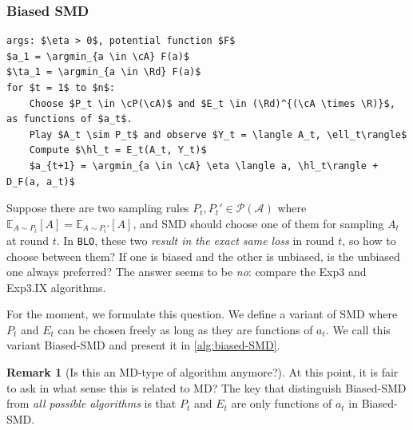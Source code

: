 \documentclass{article}
\theoremstyle{plain}
\theoremstyle{definition}
\newtheorem{remark}[theorem]{Remark}
\newcommand{\R}{\mathbb R}
\newcommand{\Rd}{\mathbb{R}^d}
\newcommand{\argmin}{\operatornamewithlimits{arg\,min}}
\newcommand{\E}{\mathbb E}
\newcommand{\cA}{\mathcal A}
\newcommand{\cP}{\mathcal P}
\newcommand{\ta}{\tilde{a}}
\newcommand{\mdalg}{\textsf{MD}\xspace}
\newcommand{\smdalg}{\textsf{SMD}\xspace}
\newcommand{\expthree}{\textsf{Exp3}\xspace}
\newcommand{\expthreeix}{\textsf{Exp3.IX}\xspace}
\newcommand{\blo}{\texttt{BLO}\xspace}
\newcommand{\hl}{\hat{\ell}\xspace}
\begin{document}
\subsubsection{Biased \smdalg}
\begin{algorithm}[h!]
    \begin{minipage}{13cm}
        \begin{mdframed}
            \begin{lstlisting}
args: $\eta > 0$, potential function $F$
$a_1 = \argmin_{a \in \cA} F(a)$
$\ta_1 = \argmin_{a \in \Rd} F(a)$
for $t = 1$ to $n$:
    Choose $P_t \in \cP(\cA)$ and $E_t \in (\Rd)^{(\cA \times \R)}$, as functions of $a_t$.
    Play $A_t \sim P_t$ and observe $Y_t = \langle A_t, \ell_t\rangle$
    Compute $\hl_t = E_t(A_t, Y_t)$
    $a_{t+1} = \argmin_{a \in \cA} \eta \langle a, \hl_t\rangle + D_F(a, a_t)$
\end{lstlisting}
            \caption{Biased \smdalg}\label{alg:biased-SMD}
        \end{mdframed}
    \end{minipage}
\end{algorithm}

Suppose there are two sampling rules $P_t, P_t' \in \cP(\cA)$ where
$\E_{A \sim P_t}[A] = \E_{A \sim P_t'}[A]$, and \smdalg should choose
one of them for sampling $A_t$ at round $t$.
In \blo, these two \textit{result in the exact same loss} in round $t$,
so how to choose between them?
If one is biased and the other is unbiased,
is the unbiased one always preferred?
The answer seems to be \textit{no}: compare the \expthree and \expthreeix algorithms.

For the moment, we formulate this question.
We define a variant of \smdalg where $P_t$ and $E_t$
can be chosen freely as long as they are functions of $a_t$.
We call this variant Biased-\smdalg and present it in \cref{alg:biased-SMD}.
\begin{remark}[Is this an \mdalg-type of algorithm anymore?]
    At this point, it is fair to ask in what sense this is related
    to \mdalg? The key that distinguish Biased-\smdalg from
    \textit{all possible algorithms} is that $P_t$ and $E_t$
    are only functions of $a_t$ in Biased-\smdalg.
\end{remark}
\end{document}
